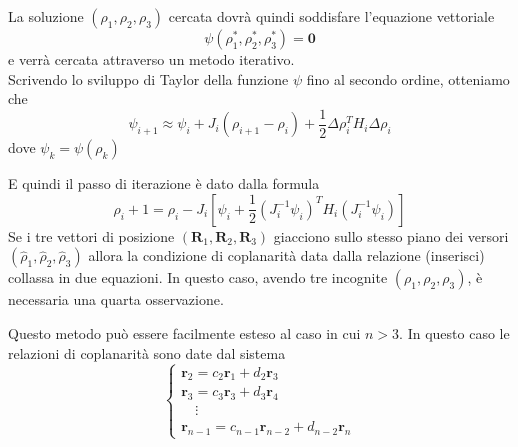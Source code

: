 \documentclass{beamer}
\begin{document}
\begin{frame}[plain]
La soluzione $(\rho_1, \rho_2, \rho_3)$ cercata dovr\`a quindi soddisfare l'equazione vettoriale \begin{equation}
\psi(\rho_1^*, \rho_2^*, \rho_3^*)=\textbf{0}
\end{equation} 
e verr\`a cercata attraverso un metodo iterativo. \\
Scrivendo lo sviluppo di Taylor della funzione $\psi$ fino al secondo ordine, otteniamo che
\begin{equation}
\psi_{i+1} \approx \psi_i + J_i (\rho_{i+1} - \rho_i) + \frac{1}{2} \Delta \rho_i^T H_i \Delta \rho_i
\end{equation}
dove $\psi_{k} = \psi(\rho_{k})$ 
\end{frame}
\begin{frame}[plain]
E quindi il passo di iterazione \`e dato dalla formula \begin{equation}
\rho_i+1=\rho_i - J_i [\psi_i + \frac{1}{2} (J_i^{-1} \psi_i)^T H_i (J_i^{-1}\psi_i)]
\end{equation}
Se i tre vettori di posizione $(\textbf{R}_1,\textbf{R}_2, \textbf{R}_3)$ giacciono sullo stesso piano dei versori $(\hat{\rho}_1, \hat{\rho}_2,\hat{\rho}_3)$ allora la condizione di coplanarit\`a data dalla relazione (inserisci) collassa in due equazioni. In questo caso, avendo tre incognite $(\rho_1,\rho_2,\rho_3)$, \`e necessaria una quarta osservazione.  
\end{frame}
\begin{frame}[plain]
Questo metodo pu\`o essere facilmente esteso al caso in cui $n>3$. 
In questo caso le relazioni di coplanarit\`a sono date dal sistema \begin{equation}
\begin{cases}
\textbf{r}_2=c_2 \textbf{r}_1 + d_2 \textbf{r}_3 \\
\textbf{r}_3=c_3 \textbf{r}_3 + d_3 \textbf{r}_4 \\
\quad \vdots \\
\textbf{r}_{n-1}=c_{n-1} \textbf{r}_{n-2} + d_{n-2} \textbf{r}_n
\end{cases}
\end{equation}
\end{frame}
\end{document}
